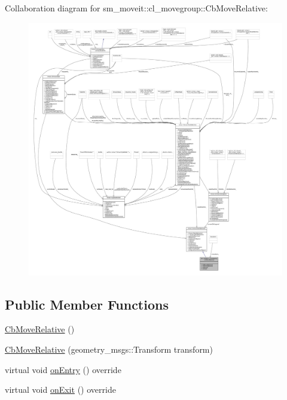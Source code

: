 Collaboration diagram for sm\+\_\+moveit\+:\+:cl\+\_\+movegroup\+:\+:Cb\+Move\+Relative\+:
\nopagebreak
\begin{figure}[H]
\begin{center}
\leavevmode
\includegraphics[width=350pt]{classsm__moveit_1_1cl__movegroup_1_1CbMoveRelative__coll__graph}
\end{center}
\end{figure}
\subsection*{Public Member Functions}
\begin{DoxyCompactItemize}
\item 
\hyperlink{classsm__moveit_1_1cl__movegroup_1_1CbMoveRelative_a224327b6bf03425fc574c15d1ce50591}{Cb\+Move\+Relative} ()
\item 
\hyperlink{classsm__moveit_1_1cl__movegroup_1_1CbMoveRelative_ae1b020e695d2e12d80ebaed2d0b5fa24}{Cb\+Move\+Relative} (geometry\+\_\+msgs\+::\+Transform transform)
\item 
virtual void \hyperlink{classsm__moveit_1_1cl__movegroup_1_1CbMoveRelative_ab74346c47eaeba74161faefe33c0f2cd}{on\+Entry} () override
\item 
virtual void \hyperlink{classsm__moveit_1_1cl__movegroup_1_1CbMoveRelative_aa4dbb9662f31442fba4405aad7d46924}{on\+Exit} () override
\end{DoxyCompactItemize}
